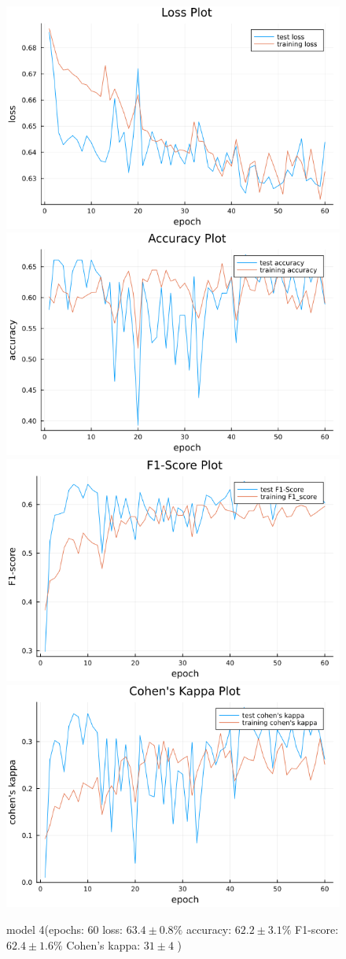 \documentclass[
a4paper, 
12pt,
grayscalebody, %
abstract=on,
twoside, BCOR10mm, 12pt, DIV13,headinclude, footexclude, final, abstracton, openright
]{ibireprt}
\numberwithin{equation}{chapter}
\numberwithin{table}{chapter}
\numberwithin{figure}{chapter}
\numberwithin{algorithm}{chapter}
\numberwithin{example}{chapter}
\numberwithin{example}{chapter}
\begin{document}
\begin{figure}
	\includegraphics[width=0.4\linewidth]{loss_png_final_1_4.png}\hfill
	\includegraphics[width=0.4\linewidth]{accuracy_png_final_1_4.png}
	\\[\smallskipamount]
	\includegraphics[width=0.4\linewidth]{f1_score_png_final_1_4.png}\hfill
	\includegraphics[width=0.4\linewidth]{cohens_kappa_png_final_1_4.png}
	\caption{model 4(epochs: 60 loss: $63.4\pm0.8\% $ accuracy: $62.2\pm3.1\%$ F1-score: $62.4\pm1.6\%$  Cohen's kappa: $31\pm4$ )}
\end{figure}
\end{document}
